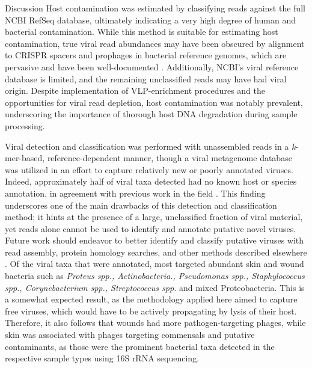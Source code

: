 \documentclass[oneside,12pt,final]{sty/ucthesis-CA2012}
\begin{document}
\begin{mainmatter}
\begin{section}{Discussion}
Host contamination was estimated by classifying reads against the full NCBI RefSeq database, ultimately indicating a very high degree of human and bacterial contamination. While this method is suitable for estimating host contamination, true viral read abundances may have been obscured by alignment to CRISPR spacers and prophages in bacterial reference genomes, which are pervasive and have been well-documented \cite{RN80, RN133}. Additionally, NCBI's viral reference database is limited, and the remaining unclassified reads may have had viral origin. Despite implementation of VLP-enrichment procedures and the opportunities for viral read depletion, host contamination was notably prevalent, underscoring the importance of thorough host DNA degradation during sample processing.   

Viral detection and classification was performed with unassembled reads in a \textit{k}-mer-based, reference-dependent manner, though a viral metagenome database was utilized in an effort to capture relatively new or poorly annotated viruses. Indeed, approximately half of viral taxa detected had no known host or species annotation, in agreement with previous work in the field \cite{RN56, RN79}. This finding underscores one of the main drawbacks of this detection and classification method; it hints at the presence of a large, unclassified fraction of viral material, yet reads alone cannot be used to identify and annotate putative novel viruses. Future work should endeavor to better identify and classify putative viruses with read assembly, protein homology searches, and other methods described elsewhere \cite{RN132, RN133, RN134, RN135, RN136, RN154}. Of the viral taxa that were annotated, most targeted abundant skin and wound bacteria such as \textit{Proteus spp., Actinobacteria., Pseudomonas spp., Staphylococcus spp., Corynebacterium spp., Streptococcus spp.} and mixed Proteobacteria. This is a somewhat expected result, as the methodology applied here aimed to capture free viruses, which would have to be actively propagating by lysis of their host. Therefore, it also follows that wounds had more pathogen-targeting phages, while skin was associated with phages targeting commensals and putative contaminants, as those were the prominent bacterial taxa detected in the respective sample types using 16S rRNA sequencing.


\end{section}
\end{mainmatter}
\end{document}
